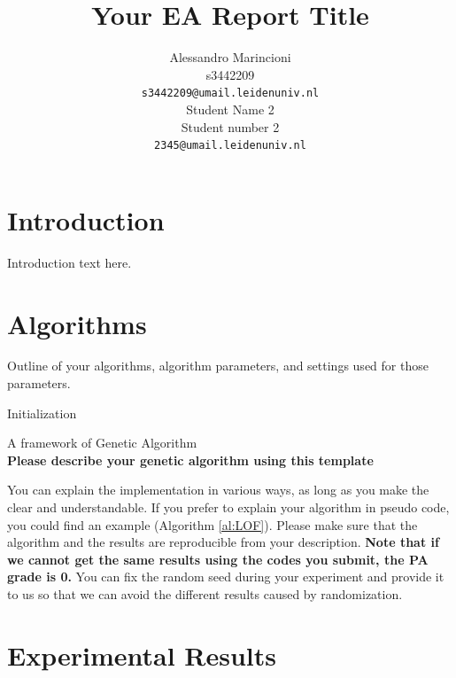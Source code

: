 \documentclass{article}
\title{Your EA Report Title}
\author{
 Alessandro Marincioni\\
  s3442209\\
  \texttt{s3442209@umail.leidenuniv.nl}\\
   \And
 Student Name 2\\
  Student number 2\\
  \texttt{2345@umail.leidenuniv.nl} \\
}
\newcommand{\note}[1]{\textbf{#1}}
\begin{document}
\maketitle




\section{Introduction}\label{sec:intro}

Introduction text here.

\section{Algorithms}
\label{sec:imple}

Outline of your algorithms, algorithm parameters, and settings used for those parameters. 

\begin{algorithm}[!ht]
\SetAlgoLined
{}

\BlankLine

Initialization\;

\caption{A framework of Genetic Algorithm \\\note{Please describe your genetic algorithm using this template}}\label{al:LOF}
\end{algorithm}
 
You can explain the implementation in various ways, as long as you make the clear and understandable. If you prefer to explain your algorithm in pseudo code, you could find an example (Algorithm \ref{al:LOF}). Please make sure that the algorithm and the results are reproducible from your description. \note{Note that if we cannot get the same results using the codes you submit, the PA grade is 0.} You can fix the random seed during your experiment and provide it to us so that we can avoid the different results caused by randomization. 




\section{Experimental Results}\label{sec:experi}
\end{document}
